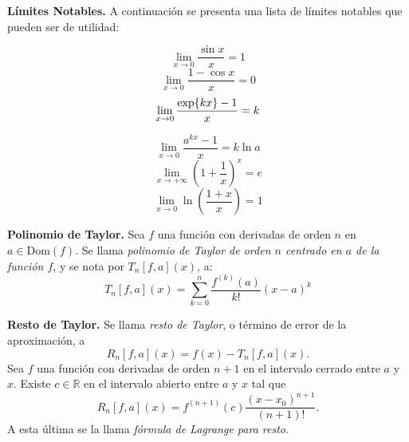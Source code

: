 \begin{obs}{\textbf{Límites Notables.}}
    \label{obs:LimitesNotables}
    A continuación se presenta una lista de límites notables que pueden ser de utilidad:

    \begin{minipage}{0.45\textwidth}
        \begin{equation}
            \lim_{x\to 0}{\frac{\sin{x}}{x}}=1
            \label{limNot:sen(x)/x}
        \end{equation}
        \begin{equation}
            \lim_{x\to 0}{\frac{1-\cos{x}}{x}}=0
            \label{limNot:(1-cos(x))/x}
        \end{equation}
        \begin{equation}
            \lim_{x\to 0}{\frac{\exp{kx}-1}{x}}=k
            \label{limNot:(e^{kx}-1)/(x)}
        \end{equation}
    \end{minipage}
    \hfill
    \begin{minipage}{0.45\textwidth}
        \begin{equation}
            \lim_{x\to 0}{\frac{a^{kx}-1}{x}}=k\ln{a}
            \label{limNot:(a^(kx)-1)/(x)}
        \end{equation}
        \begin{equation}
            \lim_{x\to +\infty}{\left( 1+\frac{1}{x} \right)^x}=e
            \label{limNot:e}
        \end{equation}
        \begin{equation}
            \lim_{x\to 0}{\ln{\left(\frac{1+x}{x} \right)}}=1
            \label{limNot:ln(1+x/x)}
        \end{equation}
    \end{minipage}
\end{obs}

\begin{definition}{\textbf{Polinomio de Taylor.}}
    Sea $f$ una función con derivadas de orden $n$ en $a \in \text{Dom}(f)$. Se llama \textit{polinomio de Taylor de orden $n$ centrado en $a$ de la función $f$}, y se nota por $T_n[f,a](x)$, a:
    \begin{equation*}
        T_n[f,a](x) = \sum^n_{k=0} \frac{f^{(k)}(a)}{k!}(x-a)^k 
    \end{equation*}
    \label{def:PolTaylor}
\end{definition}

\begin{definition}{\textbf{Resto de Taylor.}}
    Se llama \textit{resto de Taylor}, o término de
    error de la aproximación, a
    \begin{equation*}
        R_n[f,a](x) = f(x)-T_n[f,a](x).
    \end{equation*}
    Sea $f$ una función con derivadas de orden $n+1$ en el intervalo cerrado entre $a$ y $x$. 
    Existe $c\in\mathbb{R}$ en el intervalo abierto entre $a$ y $x$ tal que
    \begin{equation*}
        R_n[f,a](x) = f^{(n+1)}(c)\frac{(x-x_0)^{n+1}}{(n+1)!}.
    \end{equation*}
    A esta última se la llama \textit{fórmula de Lagrange para resto}.
    \label{def:RestoTaylor}
\end{definition}